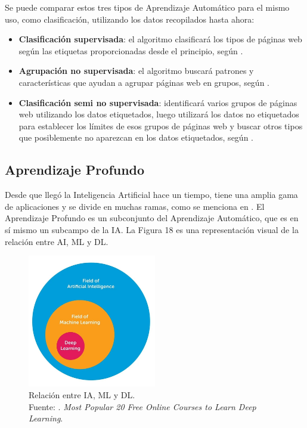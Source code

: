 \begin{itemize}
	Se puede comparar estos tres tipos de Aprendizaje Automático para el mismo uso, como clasificación, utilizando los datos recopilados hasta ahora:

	\begin{itemize}
		\item \textbf{Clasificación supervisada}: el algoritmo clasificará los tipos de páginas web según las etiquetas proporcionadas desde el principio, según \parencite{bk_zambrano2018supnosup}.
		\item \textbf{Agrupación no supervisada}: el algoritmo buscará patrones y características que ayudan a agrupar páginas web en grupos, según \parencite{bk_zambrano2018supnosup}.
		\item \textbf{Clasificación semi no supervisada}: identificará varios grupos de páginas web utilizando los datos etiquetados, luego utilizará los datos no etiquetados para establecer los límites de esos grupos de páginas web y buscar otros tipos que posiblemente no aparezcan en los datos etiquetados, según \parencite{bk_zambrano2018supnosup}.
	\end{itemize}
	
\end{itemize}

\subsection{Aprendizaje Profundo}

Desde que llegó la Inteligencia Artificial hace un tiempo, tiene una amplia gama de aplicaciones y se divide en muchas ramas, como se menciona en \parencite{gl_sas_deeplearning}. El Aprendizaje Profundo es un subconjunto del Aprendizaje Automático, que es en sí mismo un subcampo de la IA. La Figura 18 es una representación visual de la relación entre AI, ML y DL.

\begin{figure}[!ht]
	\begin{center}
		\includegraphics[width=0.50\textwidth]{2/figures/deeplearning_machinelearning.jpg}
		\caption[Relación entre IA, ML y DL]{Relación entre IA, ML y DL.\\
		Fuente: \cite{tec_cook2018deeplearning}. \textit{Most Popular 20 Free Online Courses to Learn Deep Learning}.}
		\label{2:fig5}
	\end{center}
\end{figure}

